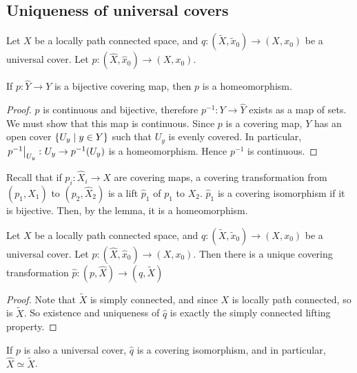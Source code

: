 \subsection{Uniqueness of universal covers}
Let \( X \) be a locally path connected space, and \( q \colon (\widetilde X, \widetilde x_0) \to (X,x_0) \) be a universal cover.
Let \( p \colon (\hat X, \hat x_0) \to (X, x_0) \).
\begin{lemma}
	If \( p \colon \hat Y \to Y \) is a bijective covering map, then \( p \) is a homeomorphism.
\end{lemma}
\begin{proof}
	\( p \) is continuous and bijective, therefore \( p^{-1} \colon Y \to \hat Y \) exists as a map of sets.
	We must show that this map is continuous.
	Since \( p \) is a covering map, \( Y \) has an open cover \( \qty{U_y \mid y \in Y} \) such that \( U_y \) is evenly covered.
	In particular, \( \eval{p^{-1}}_{U_y} \colon U_y \to p^{-1}(U_y) \) is a homeomorphism.
	Hence \( p^{-1} \) is continuous.
\end{proof}
Recall that if \( p_i \colon \hat X_i \to X \) are covering maps, a covering transformation from \( (p_1, \hat X_1) \) to \( (p_2, \hat X_2) \) is a lift \( \hat p_1 \) of \( p_1 \) to \( X_2 \).
\( \hat p_1 \) is a covering isomorphism if it is bijective.
Then, by the lemma, it is a homeomorphism.
\begin{proposition}
	Let \( X \) be a locally path connected space, and \( q \colon (\widetilde X, \widetilde x_0) \to (X,x_0) \) be a universal cover.
	Let \( p \colon (\hat X, \hat x_0) \to (X, x_0) \).
	Then there is a unique covering transformation \( \hat p \colon (p, \hat X) \to (q, \widetilde X) \)
	\begin{center}
	\end{center}
\end{proposition}
\begin{proof}
	Note that \( \widetilde X \) is simply connected, and since \( X \) is locally path connected, so is \( \widetilde X \).
	So existence and uniqueness of \( \hat q \) is exactly the simply connected lifting property.
\end{proof}
\begin{corollary}
	If \( p \) is also a universal cover, \( \hat q \) is a covering isomorphism, and in particular, \( \hat X \simeq \widetilde X \).
\end{corollary}
